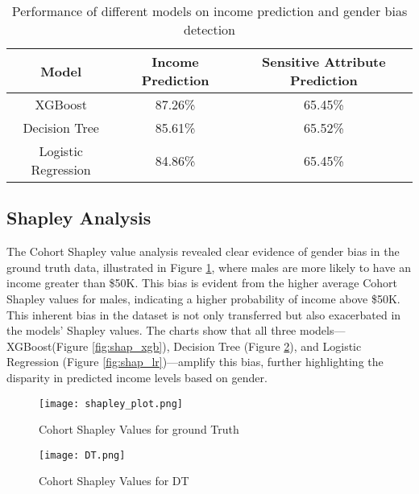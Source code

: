\documentclass[conference]{IEEEtran}
\begin{document}
\begin{table}[htbp]
\centering
\caption{Performance of different models on income prediction and gender bias detection}
\label{tab:model_performance}
\scriptsize %
\setlength{\tabcolsep}{4pt} %
\begin{center}
\begin{tabular}{|c|c|c|}
\hline
\textbf{Model} & \textbf{Income Prediction} & \textbf{Sensitive Attribute Prediction} \\
\hline
XGBoost & 87.26\% & 65.45\% \\
Decision Tree & 85.61\% & 65.52\% \\
Logistic Regression & 84.86\% & 65.45\% \\
\hline
\end{tabular}
\end{center}
\end{table}



\subsection{Shapley Analysis}

The Cohort Shapley value analysis revealed clear evidence of gender bias in the ground truth data, illustrated in Figure \ref{fig:shap_gt}, where males are more likely to have an income greater than \$50K. This bias is evident from the higher average Cohort Shapley values for males, indicating a higher probability of income above \$50K. This inherent bias in the dataset is not only transferred but also exacerbated in the models' Shapley values. The charts show that all three models—XGBoost(Figure \ref{fig:shap_xgb}), Decision Tree (Figure \ref{fig:shap_dt}), and Logistic Regression (Figure \ref{fig:shap_lr})—amplify this bias, further highlighting the disparity in predicted income levels based on gender.


\begin{figure}[h]
    \centering
    \texttt{[image: shapley\_plot.png]}
    \caption{Cohort Shapley Values for ground Truth} 
    \label{fig:shap_gt} 
\end{figure}

\begin{figure}[h]
    \centering
    \texttt{[image: DT.png]}
    \caption{Cohort Shapley Values for DT} 
    \label{fig:shap_dt} 
\end{figure}
\end{document}
